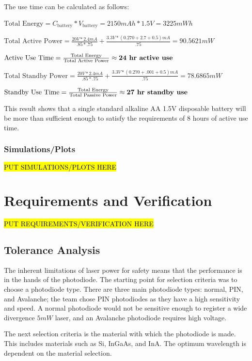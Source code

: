 \documentclass[letterpaper,10pt]{article}
\begin{document}
\begin{spacing}{1.15}
The use time can be calculated as follows:

\begin{center} 
	$\textrm{Total Energy} = C_\textrm{battery} * V_\textrm{battery} = 2150 mAh * 1.5V = 3225 mWh$
	
	$\textrm{Total Active Power} = \frac{20V * 2.4 mA}{.85 * .75} + \frac{3.3 V * (0.270 + 2.7 + 0.5) mA}{.75} = 90.5621 mW$
	
	$\textrm{Active Use Time} = \frac{\textrm{Total Energy}}{\textrm{Total Active Power}} \approx \textrm{\textbf{24 hr active use}}$
	
	$\textrm{Total Standby Power} = \frac{20V * 2.4 mA}{.85 * .75} + \frac{3.3 V * (0.270 + .001 + 0.5) mA}{.75} = 78.6865 mW$
	
	$\textrm{Standby Use Time} = \frac{\textrm{Total Energy}}{\textrm{Total Passive Power}} \approx \textrm{\textbf{27 hr standby use}}$
\end{center}

This result shows that a single standard alkaline AA 1.5V disposable battery will be more than sufficient enough to satisfy the requirements of 8 hours of active use time.


\subsubsection{Simulations/Plots}
\hl{PUT SIMULATIONS/PLOTS HERE}


\section{Requirements and Verification} \label{section-requirements-verification}
\hl{PUT REQUIREMENTS/VERIFICATION HERE}

\subsection{Tolerance Analysis} \label{section-tolerance-analysis}
The inherent limitations of laser power for safety means that the performance is in the hands of the photodiode. The starting point for selection criteria was to choose a photodiode type. There are three main photodiode types: normal, PIN, and Avalanche; the team chose PIN photodiodes as they have a high sensitivity and speed. A normal photodiode would not be sensitive enough to register a wide divergence $5mW$ laser, and an Avalanche photodiode requires high voltage. 

The next selection criteria is the material with which the photodiode is made. This includes materials such as Si, InGaAs, and InA. The optimum wavelength is dependent on the material selection.


\end{spacing}
\end{document}
